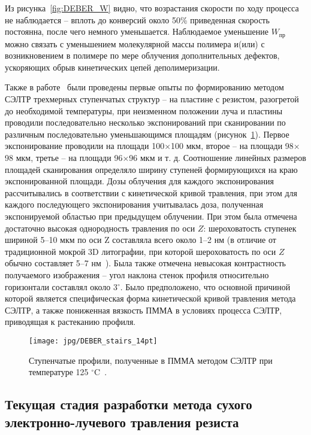 Из рисунка~\ref{fig:DEBER_W} видно, что возрастания скорости по ходу процесса не наблюдается -- вплоть до конверсий около 50\% приведенная скорость постоянна, после чего немного уменьшается. Наблюдаемое уменьшение $W_{\text{пр}}$ можно связать с уменьшением молекулярной массы полимера и(или) с возникновением в полимере по мере облучения дополнительных дефектов, ускоряющих обрыв кинетических цепей деполимеризации.

Также в работе~\cite{Bruk_2013} были проведены первые опыты по формированию методом СЭЛТР трехмерных ступенчатых структур -- на пластине с резистом, разогретой до необходимой температуры, при неизменном положении луча и пластины проводили последовательно несколько экспонирований при сканировании по различным последовательно уменьшающимся площадям (рисунок~\ref{fig:DEBER_stairs}). Первое экспонирование проводили на площади 100$\times$100 мкм, второе -- на площади 98$\times$98 мкм, третье -- на площади 96$\times$96 мкм и т. д. Соотношение линейных размеров площадей сканирования определяло ширину ступеней формирующихся на краю экспонированной площади. Дозы облучения для каждого экспонирования рассчитывались в соответствии с кинетической кривой травления, при этом для каждого последующего экспонирования учитывалась доза, полученная экспонируемой областью при предыдущем облучении. При этом была отмечена достаточно высокая однородность травления по оси $Z$: шероховатость ступенек шириной 5–10 мкм по оси Z составляла всего около 1–2 нм (в отличие от традиционной \textquotedbl мокрой\textquotedbl{} 3D литографии, при которой шероховатость по оси $Z$ обычно составляет 5–7 нм~\cite{Murali_e_beam_roughness}).
Была также отмечена невысокая контрастность получаемого изображения -- угол наклона стенок профиля относительно горизонтали составлял около 3$^\circ$. Было предположено, что основной причиной которой является специфическая форма кинетической кривой травления метода СЭЛТР, а также пониженная вязкость ПММА в условиях процесса СЭЛТР, приводящая к растеканию профиля.

\begin{figure}
	\centering
	\texttt{[image: jpg/DEBER\_stairs\_14pt]}
	\caption{Ступенчатые профили, полученные в ПММА методом СЭЛТР при температуре 125 $^\circ$C~\cite{Bruk_2013}.}
	\label{fig:DEBER_stairs}
\end{figure}


\subsection{Текущая стадия разработки метода сухого электронно-лучевого травления резиста}

